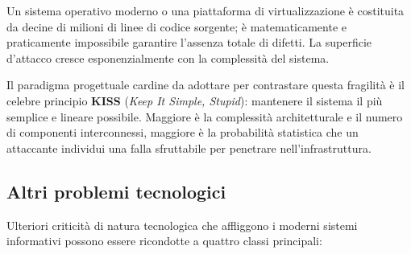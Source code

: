 \documentclass[../../main.tex]{subfiles}
\begin{document}
Un sistema operativo moderno o una piattaforma di virtualizzazione è costituita da decine di milioni di linee di codice sorgente; è matematicamente e praticamente impossibile garantire l'assenza totale di difetti. La superficie d'attacco cresce esponenzialmente con la complessità del sistema.

Il paradigma progettuale cardine da adottare per contrastare questa fragilità è il celebre principio \textbf{KISS} (\textit{Keep It Simple, Stupid}): mantenere il sistema il più semplice e lineare possibile. Maggiore è la complessità architetturale e il numero di componenti interconnessi, maggiore è la probabilità statistica che un attaccante individui una falla sfruttabile per penetrare nell'infrastruttura.

\subsection{Altri problemi tecnologici}
\label{subsec:altri_problemi_tecnologici}

Ulteriori criticità di natura tecnologica che affliggono i moderni sistemi informativi possono essere ricondotte a quattro classi principali:
\end{document}
